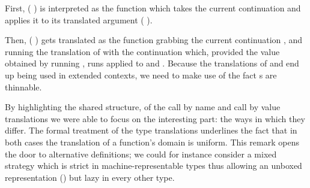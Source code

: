 First, ( ) is interpreted as the function which takes the current
continuation and applies it to its translated argument ( ).


Then, (  ) gets translated as the function grabbing the
current continuation , and running the translation of  with the
continuation which, provided the value  obtained by running ,
runs  applied to  and . Because the translations of 
and  end up being used in extended contexts, we need to make use of the
fact s are thinnable.


By highlighting the shared structure, of the call by name and call by value
translations we were able to focus on the interesting part: the ways in which
they differ. The formal treatment of the type translations underlines the
fact that in both cases the translation of a function's domain is uniform.
This remark opens the door to alternative definitions; we could for instance
consider a mixed strategy which is strict in machine-representable types thus
allowing an unboxed representation (\cite{10.1007/3540543961_30}) but lazy in
every other type.
